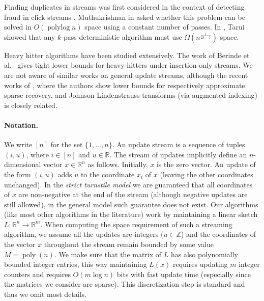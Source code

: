 \documentclass[9pt,letterpaper]{article}
\theoremstyle{remark}
\DeclareMathOperator{\polylog}{polylog}
\DeclareMathOperator{\poly}{poly}
\begin{document}
Finding duplicates in streams was first considered 
in the context of detecting fraud in click streams \cite{MetwallyAA05}. 
Muthukrishnan in \cite{Muthukrishnan}
asked whether this problem can be solved in 
$O(\polylog n)$ space using a constant number of passes. In \cite{Tarui}, Tarui showed
that any $k$-pass deterministic algorithm must use $\Omega(n^{\frac1{2k-1}})$
space. 
 
Heavy hitter algorithms have been studied extensively. 
The work of Berinde et al.\
\cite{BerindeCIS09} gives tight lower bounds for heavy hitters under 
 insertion-only streams. We are not aware of similar works on
general update streams, although the recent works of \cite{BaIPW10, WoodruffJ11},
 where the authors show lower bounds for respectively approximate
sparse recovery, and Johnson-Lindenstrauss transforms (via augmented indexing) is closely related.    
    

\paragraph{Notation.}
We write $[n]$ for the set $\{1,\ldots,n\}$.
An update stream is a sequence of tuples $(i,u)$, where $i\in [n]$ 
and $u\in\mathbb R$. The stream of updates implicitly define an $n$-dimensional
vector $x\in\mathbb R^n$ as follows. Initially, $x$ is the zero vector. An update of the form
$(i,u)$ adds $u$ to the coordinate $x_i$ of $x$ (leaving the other coordinates unchanged).
In the {\em strict turnstile model}
we are guaranteed that all coordinates of $x$ are non-negative at the end
of the stream
(although negative updates are still allowed), in the general model such
guarantee does not exist. Our
algorithms (like most other algorithms in the literature) work by maintaining
a linear sketch $L:\mathbb R^n\to\mathbb R^m$.
When computing the space requirement of such a
streaming algorithm, we assume all the updates are integers ($u\in\mathbb Z$)
and the coordinates of the vector $x$ throughout the stream remain bounded by
some value $M=\poly(n)$. We
make sure that the matrix of $L$ has also polynomially bounded
integer entries, this way maintaining $L(x)$ requires updating $m$ integer
counters and requires $O(m\log n)$ bits with fast
update time (especially since the matrices we consider are sparse). This
discretization step is standard and thus we omit most details.
\end{document}
